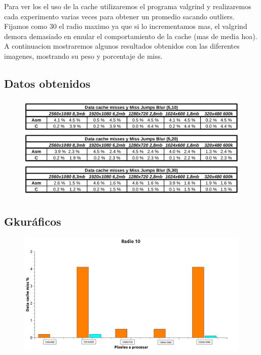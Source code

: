 Para ver los el uso de la cache utilizaremos el programa valgrind y realizaremos cada experimento varias veces para obtener un promedio sacando outliers. Fijamos como 30 el radio maximo ya que si lo incrementamos mas, el valgrind demora demasiado en emular el comportamiento de la cache (mas de media hoa). A continuacion mostraremos algunos resultados obtenidos con las diferentes imagenes, mostrando su peso y porcentaje de miss. \\

\subsection{Datos obtenidos}

\begin{figure}[H]
\begin{center}
  \includegraphics[width=\linewidth]{cache/tabla.png}
\end{center}
\end{figure}

\subsection{Gkuráficos} 


\begin{figure}[H]
\begin{center}
  \includegraphics[width=\linewidth]{cache/Radio10.png}
\end{center}
\end{figure}

